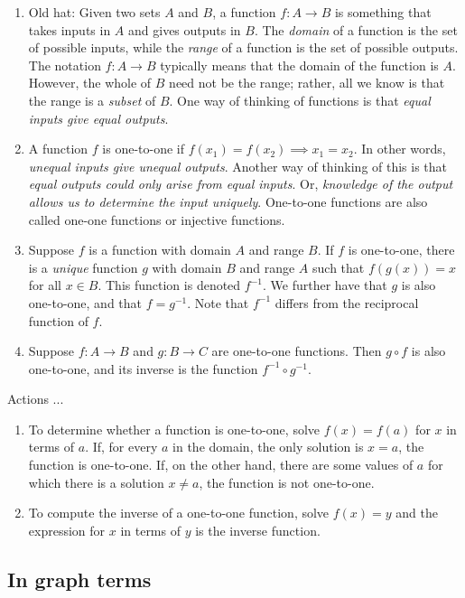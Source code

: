 \documentclass[10pt]{amsart}
\begin{document}
\begin{enumerate}
\item Old hat: Given two sets $A$ and $B$, a function $f:A \to B$ is
  something that takes inputs in $A$ and gives outputs in $B$. The
  {\em domain} of a function is the set of possible inputs, while the
  {\em range} of a function is the set of possible outputs. The
  notation $f:A \to B$ typically means that the domain of the function
  is $A$. However, the whole of $B$ need not be the range; rather, all
  we know is that the range is a {\em subset} of $B$. One way of
  thinking of functions is that {\em equal inputs give equal outputs}.
\item A function $f$ is one-to-one if $f(x_1) = f(x_2) \implies x_1 =
  x_2$. In other words, {\em unequal inputs give unequal
  outputs}. Another way of thinking of this is that {\em equal outputs
  could only arise from equal inputs}. Or, {\em knowledge of the
  output allows us to determine the input uniquely}. One-to-one
  functions are also called one-one functions or injective functions.
\item Suppose $f$ is a function with domain $A$ and range $B$. If $f$
  is one-to-one, there is a {\em unique} function $g$ with domain $B$
  and range $A$ such that $f(g(x)) = x$ for all $x \in B$. This
  function is denoted $f^{-1}$.  We further have that $g$ is also
  one-to-one, and that $f = g^{-1}$. Note that $f^{-1}$ differs from
  the reciprocal function of $f$.
\item Suppose $f: A \to B$ and $g:B \to C$ are one-to-one
  functions. Then $g \circ f$ is also one-to-one, and its inverse is
  the function $f^{-1} \circ g^{-1}$.
\end{enumerate}

Actions ...

\begin{enumerate}
\item To determine whether a function is one-to-one, solve $f(x) =
  f(a)$ for $x$ in terms of $a$. If, for every $a$ in the domain, the
  only solution is $x = a$, the function is one-to-one. If, on the
  other hand, there are some values of $a$ for which there is a
  solution $x \ne a$, the function is not one-to-one.
\item To compute the inverse of a one-to-one function, solve $f(x) =
  y$ and the expression for $x$ in terms of $y$ is the inverse function.
\end{enumerate}

\subsection{In graph terms}
\end{document}
